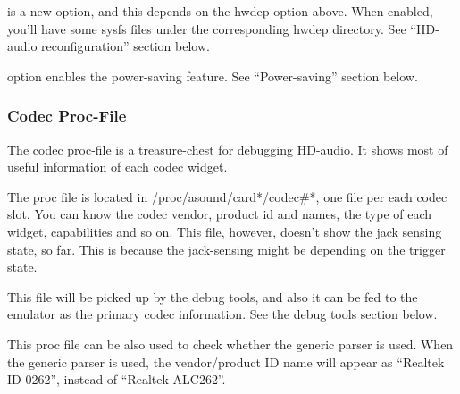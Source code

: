 \documentclass[a4paper,8pt,english]{sphinxmanual}
\begin{document}
 is a new option, and this depends on the
hwdep option above.  When enabled, you'll have some sysfs files under
the corresponding hwdep directory.  See ``HD-audio reconfiguration''
section below.

 option enables the power-saving feature.
See ``Power-saving'' section below.


\subsubsection{Codec Proc-File}
\label{sound/hd-audio/notes:codec-proc-file}
The codec proc-file is a treasure-chest for debugging HD-audio.
It shows most of useful information of each codec widget.

The proc file is located in /proc/asound/card*/codec\#*, one file per
each codec slot.  You can know the codec vendor, product id and
names, the type of each widget, capabilities and so on.
This file, however, doesn't show the jack sensing state, so far.  This
is because the jack-sensing might be depending on the trigger state.

This file will be picked up by the debug tools, and also it can be fed
to the emulator as the primary codec information.  See the debug tools
section below.

This proc file can be also used to check whether the generic parser is
used.  When the generic parser is used, the vendor/product ID name
will appear as ``Realtek ID 0262'', instead of ``Realtek ALC262''.
\end{document}

